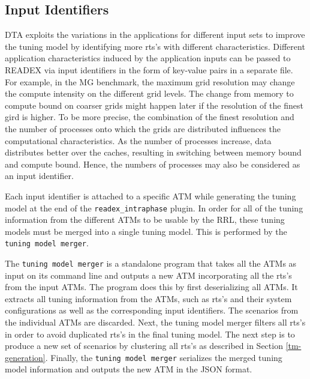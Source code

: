 \subsection{Input Identifiers} \label{sec:input}

DTA exploits the variations in the applications for different input sets to improve the tuning model by identifying more rts's with different characteristics. Different application characteristics induced by the application inputs can be passed to READEX via input identifiers in the form of key-value pairs in a separate file. For example, in the MG benchmark, the maximum grid resolution may change the compute intensity on the different grid levels. The change from memory to compute bound on coarser grids might happen later if the resolution of the finest gird is higher. To be more precise, the combination of the finest resolution and the number of processes onto which the grids are distributed influences the computational characteristics. As the number of processes increase, data distributes better over the caches, resulting in switching between memory bound and compute bound. Hence, the numbers of processes may also be considered as an input identifier. 

Each input identifier is attached to a specific ATM while generating the tuning model at the end of the \texttt{readex\_intraphase} plugin. In order for all of the tuning information from the different ATMs to be usable by the RRL, these tuning models must be merged into a single tuning model. This is performed by the \texttt{tuning model merger}.

The \texttt{tuning model merger} is a standalone program that takes all the ATMs as input on its command line and outputs a new ATM incorporating all the rts's from the input ATMs. The program does this by first deserializing all ATMs. It extracts all tuning information from the ATMs, such as rts's and their system configurations as well as the corresponding input identifiers. The scenarios from the individual ATMs are discarded. Next, the tuning model merger filters all rts's in order to avoid duplicated rts's in the final tuning model. The next step is to produce a new set of scenarios by clustering all rts's as described in Section \ref{tm-generation}. Finally, the \texttt{tuning model merger} serializes the merged tuning model information and outputs the new ATM in the JSON format.
